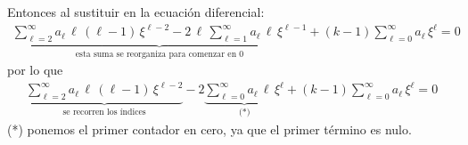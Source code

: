 Entonces al sustituir en la ecuación diferencial:
\begin{align*}
\underbrace{\sum_{\ell=2}^{\infty} a_{\ell} \, \ell \, (\ell - 1) \, \xi^{\ell-2} - 2 \, \ell \, \sum_{\ell=1}^{\infty} a_{\ell} \, \ell \, \xi^{\ell-1}}_{\text{esta suma se reorganiza para comenzar en } 0} + (k - 1) \sum_{\ell=0}^{\infty} a_{\ell} \, \xi^{\ell} = 0
\end{align*}
por lo que
\begin{align*}
\underbrace{\sum_{\ell=2}^{\infty} a_{\ell} \, \ell \, (\ell - 1) \, \xi^{\ell-2}}_{\text{se recorren los índices}} - 2 \underbrace{\sum_{\ell=0}^{\infty} a_{\ell} \, \ell \, \xi^{\ell}}_{\text{(*)}} + (k - 1) \sum_{\ell=0}^{\infty} a_{\ell} \, \xi^{\ell} = 0
\end{align*}
(*) ponemos el primer contador en cero, ya que el primer término es nulo.
\par

